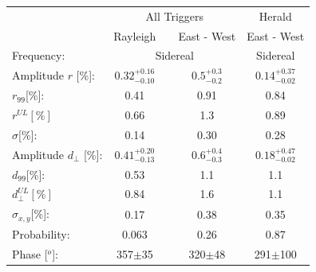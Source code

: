 \documentclass[12pt, doublespace, oneside]{article}
\begin{document}
    \begin{table}[H]
        \vspace*{-0.51 cm}
        \begin{small}
            \begin{center}
                \begin{tabular}[c]{l|c|c|c||c|}
                    \cline{2-5}                 & \multicolumn{3}{c||}{All Triggers}                  & Herald     \\
                    \cline{2-5}                 & Rayleigh               &       & East - West                 & East - West\cite{Aab_2020}      \\\hline
\multicolumn{1}{|l|}{Frequency:             }  & \multicolumn{3}{c||}{Sidereal}                               & Sidereal        \\ \hline
\multicolumn{1}{|l|}{Amplitude $r$ [\%]:      }  & $0.32^{+0.16}_{-0.10}$ &  	    & $0.5^{+0.3}_{-0.2}$         & $0.14^{+0.37}_{-0.02}$\cite{codigo}       \\
\multicolumn{1}{|l|}{$r_{99}$[\%]:           }  & 0.41	                 &         & 0.91                        & 0.84\cite{codigo}        \\
\multicolumn{1}{|l|}{$r^{UL}[\%]$      }        & 0.66                   &         & 1.3                         & 0.89 \cite{codigo}        \\
\multicolumn{1}{|l|}{$\sigma$[\%]:     }        & 0.14                   &         & 0.30	                    & 0.28 \cite{codigo}          \\ \hline
\multicolumn{1}{|l|}{Amplitude $d_\perp$ [\%]:}  & $0.41^{+0.20}_{-0.13}$ &         & $0.6^{+0.4}_{-0.3}$         & $0.18^{+0.47}_{-0.02}$       \\ 
\multicolumn{1}{|l|}{$d_{99}$[\%]:           }  & 0.53	                 &        & 1.1                         & 1.1\cite{codigo}        \\
\multicolumn{1}{|l|}{$d_{\perp}^{UL}[\%]$    }  & 0.84                   &         & 1.6                         & 1.1        \\
\multicolumn{1}{|l|}{$\sigma_{x,y}$[\%]:     }  & 0.17                   &         & 0.38	                    & 0.35          \\ \hline
\multicolumn{1}{|l|}{Probability:           }  & 0.063	                 &            & 0.26                        & 0.87          \\
\multicolumn{1}{|l|}{Phase [$^o$]:             }  & 357$\pm$35             &        & 320$\pm$48                 & 291$\pm$100      \\\hline

\end{tabular}
\end{center}
\end{small}
\end{table}
\end{document}
